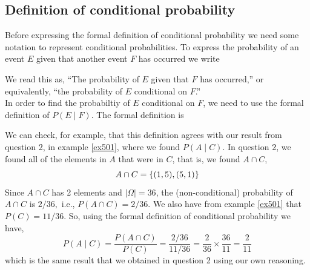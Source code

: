 \subsection{Definition of conditional probability} \label{sec508}
Before expressing the formal definition of conditional probability we need some notation to represent conditional probabilities. To express the probability of an event $E$ given that another event $F$ has occurred we write \label{symbconditional} \label{conditional probability}
\bigskip

\hfil{}
\bigskip

\noindent We read this as, ``The probability of $E$ given that $F$ has occurred,'' or equivalently, ``the probability of $E$ conditional on $F$.'' \\

\noindent In order to find the probabiltiy of $E$ conditional on $F$, we need to use the formal definition of $P(E \! \mid \! F)$. The formal definition is
\bigskip

\hfil{}
\bigskip

\noindent We can check, for example, that this definition agrees with our result from question 2, in example \ref{ex501}, where we found $P(A \! \mid \! C)$. In question 2, we found all of the elements in $A$ that were in $C$, that is, we found $A \cap C$,
\[
A \cap C = \left\{(1,5),(5,1)\right\}
\]
Since $A \cap C$ has 2 elements and $|\Omega| = 36$, the (non-conditional) probability of $A \cap C$ is $2/36,$ i.e., $P(A \cap C) = 2/36.$ We also have from example \ref{ex501} that $P(C) = 11/36$. So, using the formal definition of conditional probability we have,
\[
P(A \mid C) = \frac{P(A \cap C)}{P(C)} = \frac{2/36}{11/36} = \frac{2}{36}\times\frac{36}{11} = \frac{2}{11}
\]
which is the same result that we obtained in question 2 using our own reasoning. \\

